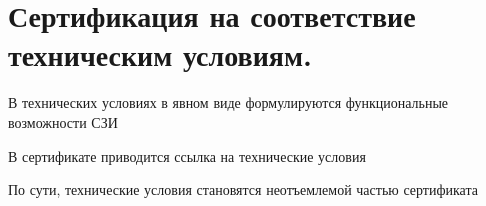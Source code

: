 \section{Сертификация на соответствие техническим условиям.}

В технических условиях в явном виде формулируются функциональные возможности СЗИ

В сертификате приводится ссылка на технические условия

По сути, технические условия становятся неотъемлемой частью сертификата